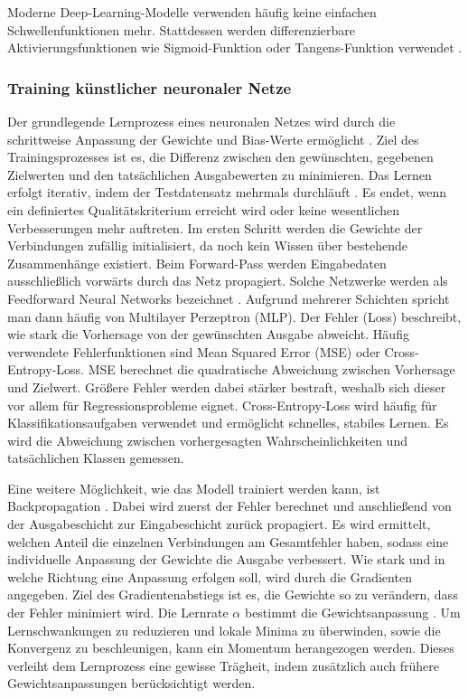 Moderne Deep-Learning-Modelle verwenden häufig keine einfachen Schwellenfunktionen mehr. Stattdessen werden differenzierbare Aktivierungsfunktionen wie Sigmoid-Funktion oder Tangens-Funktion verwendet \citep{goodfellow2016deep}. 

\subsubsection{Training künstlicher neuronaler Netze}
Der grundlegende Lernprozess eines neuronalen Netzes wird durch die schrittweise Anpassung der Gewichte und Bias-Werte ermöglicht \citep{grum2022construction}. Ziel des Trainingsprozesses ist es, die Differenz zwischen den gewünschten, gegebenen Zielwerten und den tatsächlichen Ausgabewerten zu minimieren. Das Lernen erfolgt iterativ, indem der Testdatensatz mehrmals durchläuft \citep{lammel2012kunstliche}. Es endet, wenn ein definiertes Qualitätskriterium erreicht wird oder keine wesentlichen Verbesserungen mehr auftreten. Im ersten Schritt werden die Gewichte der Verbindungen zufällig initialisiert, da noch kein Wissen über bestehende Zusammenhänge existiert. Beim Forward-Pass werden Eingabedaten ausschließlich vorwärts durch das Netz propagiert. Solche Netzwerke werden als Feedforward Neural Networks bezeichnet \citep{grum2022construction}. Aufgrund mehrerer Schichten spricht man dann häufig von Multilayer Perzeptron (MLP). Der Fehler (Loss) beschreibt, wie stark die Vorhersage von der gewünschten Ausgabe abweicht. Häufig verwendete Fehlerfunktionen sind Mean Squared Error (MSE) oder Cross-Entropy-Loss. MSE berechnet die quadratische Abweichung zwischen Vorhersage und Zielwert. Größere Fehler werden dabei stärker bestraft, weshalb sich dieser vor allem für Regressionsprobleme eignet. Cross-Entropy-Loss wird häufig für Klassifikationsaufgaben verwendet und ermöglicht schnelles, stabiles Lernen. Es wird die Abweichung zwischen vorhergesagten Wahrscheinlichkeiten und tatsächlichen Klassen gemessen. 

Eine weitere Möglichkeit, wie das Modell trainiert werden kann, ist Backpropagation \citep{goodfellow2016deep}. Dabei wird zuerst der Fehler berechnet und anschließend von der Ausgabeschicht zur Eingabeschicht zurück propagiert. Es wird ermittelt, welchen Anteil die einzelnen Verbindungen am Gesamtfehler haben, sodass eine individuelle Anpassung der Gewichte die Ausgabe verbessert. Wie stark und in welche Richtung eine Anpassung erfolgen soll, wird durch die Gradienten angegeben. Ziel des Gradientenabstiegs ist es, die Gewichte so zu verändern, dass der Fehler minimiert wird. Die Lernrate $\alpha$ bestimmt die Gewichtsanpassung \citep{lammel2012kunstliche}. Um Lernschwankungen zu reduzieren und lokale Minima zu überwinden, sowie die Konvergenz zu beschleunigen, kann ein Momentum herangezogen werden. Dieses verleiht dem Lernprozess eine gewisse Trägheit, indem zusätzlich auch frühere Gewichtsanpassungen berücksichtigt werden. 


